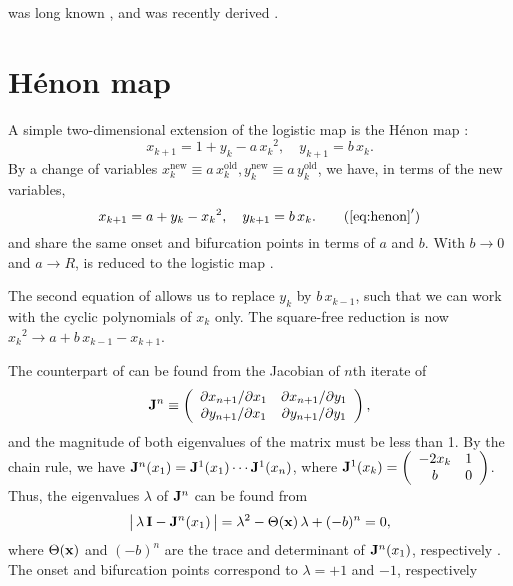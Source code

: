 \documentclass[twocolumn]{revtex4-1}
\begin{document}
 was long known \cite{mira},
and  was recently derived \cite{blackhurst}.




\section{\label{sec:henon}H\'enon map}





A simple two-dimensional extension of the logistic map
  is the H\'enon map \cite{henon}:
\begin{equation}
  x_{k+1} = 1 + y_k - a \, {x_k}^2, \quad
  y_{k+1} = b \, x_k.
\label{eq:henon}
\end{equation}
%
By a change of variables
  $x_k^\mathrm{new} \equiv a \, x_k^\mathrm{old},
   y_k^\mathrm{new} \equiv a \, y_k^\mathrm{old}$,
we have, in terms of the new variables,
\begin{equation}
  x_{k+1} = a + y_k - {x_k}^2, \quad
  y_{k+1} = b \, x_k.
\tag{$\ref{eq:henon}'$}
\label{eq:henons}
\end{equation}
%
 and  share the
same onset and bifurcation points
in terms of $a$ and $b$.
%
With $b \rightarrow 0$ and $a \rightarrow R$,
 is reduced to the logistic map .


The second equation of 
allows us to replace $y_k$ by $b \, x_{k-1}$,
  such that we can work with the cyclic polynomials of $x_k$ only.
The square-free reduction is now
  ${x_k}^2 \rightarrow a + b \, x_{k-1} - x_{k+1}$.



The counterpart of 
  can be found from the Jacobian of $n$th iterate of 
\[
  \mathbf{J}^n
  \equiv
  \left(
    \begin{array}{ccc}
      \partial x_{n+1}/\partial x_1 & \partial x_{n+1}/\partial y_1 \\
      \partial y_{n+1}/\partial x_1 & \partial y_{n+1}/\partial y_1 \\
    \end{array}
  \right),
\]
and the magnitude of both eigenvalues of the matrix must be less than 1.
By the chain rule, we have
  $\mathbf{J}^n (x_1) = \mathbf{J}^1(x_1) \cdots \mathbf{J}^1(x_n)$,
  where
$\mathbf{J}^1(x_k)
  =
  \left(
    \begin{array}{cc}
      -2 x_k & 1 \\
      b & 0
    \end{array}
  \right)$.
Thus, the eigenvalues $\lambda$ of $\mathbf{J}^n$ can be found from
%
\begin{equation}
\big|\, \lambda \, \mathbf{I} - \mathbf{J}^n(x_1) \,\big|
  = \lambda^2 - \Theta(\mathbf{x}) \,\lambda +(-b)^n = 0,
\label{eq:henonder}
\end{equation}
%
where $\Theta(\mathbf{x})$ and $(-b)^n$
  are the trace and determinant of $\mathbf{J}^n(x_1)$,
  respectively \cite{hitzl}.
The onset and bifurcation points
  correspond to $\lambda = +1$ and $-1$, respectively
\end{document}
